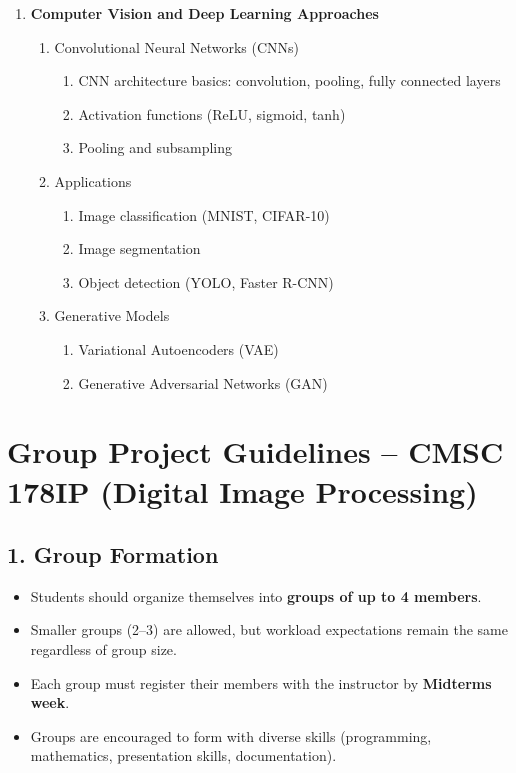 \documentclass[a4paper,10pt]{article}
\begin{document}
\begin{enumerate}[label=\Roman*.]
    \item \textbf{Computer Vision and Deep Learning Approaches}
    \begin{enumerate}[label=\alph*.]
        \item Convolutional Neural Networks (CNNs)
        \begin{enumerate}[label=\roman*.]
            \item CNN architecture basics: convolution, pooling, fully connected layers
            \item Activation functions (ReLU, sigmoid, tanh)
            \item Pooling and subsampling
        \end{enumerate}
        \item Applications
        \begin{enumerate}[label=\roman*.]
            \item Image classification (MNIST, CIFAR-10)
            \item Image segmentation
            \item Object detection (YOLO, Faster R-CNN)
        \end{enumerate}
        \item Generative Models
        \begin{enumerate}[label=\roman*.]
            \item Variational Autoencoders (VAE)
            \item Generative Adversarial Networks (GAN)
        \end{enumerate}
    \end{enumerate}
\end{enumerate}

\vspace{1.5em}

\newpage

\section*{Group Project Guidelines -- CMSC 178IP (Digital Image Processing)}

\subsection*{1. Group Formation}
\begin{itemize}
    \item Students should organize themselves into \textbf{groups of up to 4 members}.
    \item Smaller groups (2--3) are allowed, but workload expectations remain the same regardless of group size.
    \item Each group must register their members with the instructor by \textbf{Midterms week}.
    \item Groups are encouraged to form with diverse skills (programming, mathematics, presentation skills, documentation).
\end{itemize}
\end{document}
